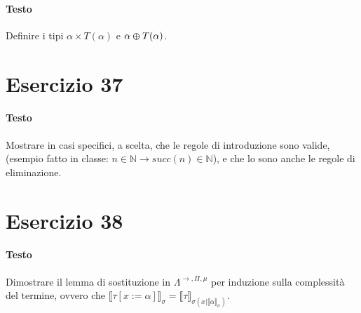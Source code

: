 \documentclass[a4paper,10pt]{article}
\begin{document}
\paragraph{Testo}
Definire i tipi $\alpha \times T(\alpha)$ e $\alpha \varoplus T(\alpha)$.

\section*{Esercizio 37}
\paragraph{Testo}
Mostrare in casi specifici, a scelta, che le regole di introduzione sono valide, (esempio fatto in classe: $n \in \mathbb{N} \rightarrow succ(n) \in \mathbb{N}$), e che lo sono anche le regole di eliminazione.

\section*{Esercizio 38}
\paragraph{Testo}
Dimostrare il lemma di sostituzione in $\Lambda^{\rightarrow, \Pi, \mu}$ per induzione sulla complessità del termine, ovvero che $\llbracket \tau [x := \alpha]\rrbracket_\sigma = \llbracket \tau \rrbracket_{\sigma(x|\llbracket \alpha \rrbracket_\sigma)}$.
\end{document}

